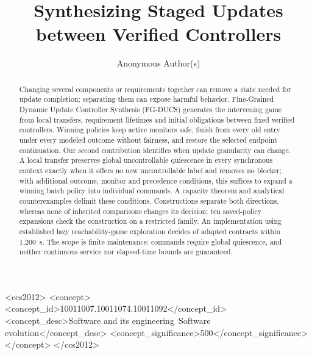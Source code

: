 \documentclass[acmsmall,screen,review,anonymous]{acmart}
\begin{document}
\title[Staged Updates between Verified Controllers]{Synthesizing Staged Updates between Verified Controllers}

\author{Anonymous Author(s)}
\renewcommand{\shortauthors}{Anonymous Author(s)}

\begin{abstract}
Changing several components or requirements together can remove a state needed for update completion; separating them can expose harmful behavior. Fine-Grained Dynamic Update Controller Synthesis (FG-DUCS) generates the intervening game from local transfers, requirement lifetimes and initial obligations between fixed verified controllers. Winning policies keep active monitors safe, finish from every old entry under every modeled outcome without fairness, and restore the selected endpoint continuation. Our second contribution identifies when update granularity can change. A local transfer preserves global uncontrollable quiescence in every synchronous context exactly when it offers no new uncontrollable label and removes no blocker; with additional outcome, monitor and precedence conditions, this suffices to expand a winning batch policy into individual commands. A capacity theorem and analytical counterexamples delimit these conditions. Constructions separate both directions, whereas none of \VThreeEOneTrials{} inherited comparisons changes its decision; ten saved-policy expansions check the construction on a restricted family. An implementation using established lazy reachability-game exploration decides \LazyDecisions{} of \ApplicationContracts{} adapted contracts within 1,200~s. The scope is finite maintenance: commands require global quiescence, and neither continuous service nor elapsed-time bounds are guaranteed.

\end{abstract}

\begin{CCSXML}
<ccs2012>
 <concept>
  <concept_id>10011007.10011074.10011092</concept_id>
  <concept_desc>Software and its engineering~Software evolution</concept_desc>
  <concept_significance>500</concept_significance>
 </concept>
</ccs2012>
\end{CCSXML}


\maketitle
\end{document}

